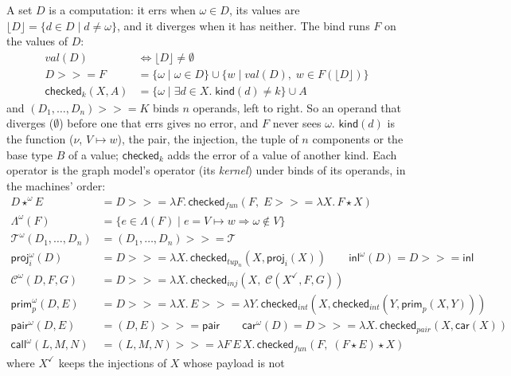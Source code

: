 \documentclass[10pt]{article}
\theoremstyle{acmplain}
\newcommand{\key}[1]{\mathsf{#1}}
\newcommand{\app}{\star}
\newcommand{\NE}{\neq\emptyset}
\newcommand{\bind}{\mathbin{>\!\!>\!\!=}}
\begin{document}
A set $D$ is a computation: it errs when $\omega \in D$, its values are
$\lfloor D \rfloor = \{ d \in D \mid d \neq \omega \}$, and it diverges
when it has neither. The bind runs $F$ on the values of $D$:
\begin{align*}
  \mathit{val}(D) &\iff \lfloor D \rfloor \NE \\
  D \bind F &= \{ \omega \mid \omega \in D \} \cup \{ w \mid \mathit{val}(D),\; w \in F(\lfloor D \rfloor) \} \\
  \key{checked}_k(X, A) &= \{ \omega \mid \exists d \in X.\; \key{kind}(d) \neq k \} \cup A
\end{align*}
and $(D_1, \ldots, D_n) \bind K$ binds $n$ operands, left to right. So an
operand that diverges ($\emptyset$) before one that errs gives no error,
and $F$ never sees $\omega$. $\key{kind}(d)$ is the function ($\nu$,
$V \mapsto w$), the pair, the injection, the tuple of $n$ components or
the base type $B$ of a value; $\key{checked}_k$ adds the error of a value
of another kind. Each operator is the graph model's operator (its
\emph{kernel}) under binds of its operands, in the machines' order:
\begin{align*}
  D \app^{\omega} E &= D \bind \lambda F.\, \key{checked}_{\mathit{fun}}(F,\; E \bind \lambda X.\, F \app X) \\
  \Lambda^{\omega}(F) &= \{ e \in \Lambda(F) \mid e = V \mapsto w \Rightarrow \omega \notin V \} \\
  \mathcal{T}^{\omega}(D_1,\ldots,D_n) &= (D_1, \ldots, D_n) \bind \mathcal{T} \\
  \key{proj}^{\omega}_i(D) &= D \bind \lambda X.\, \key{checked}_{\mathit{tup}_n}(X, \key{proj}_i(X)) \qquad
  \key{inl}^{\omega}(D) = D \bind \key{inl} \\
  \mathcal{C}^{\omega}(D, F, G) &= D \bind \lambda X.\, \key{checked}_{\mathit{inj}}(X,\; \mathcal{C}(X^{\checkmark}, F, G)) \\
  \key{prim}^{\omega}_p(D, E) &= D \bind \lambda X.\, E \bind \lambda Y.\,
    \key{checked}_{\mathit{int}}(X, \key{checked}_{\mathit{int}}(Y, \key{prim}_p(X, Y))) \\
  \key{pair}^{\omega}(D, E) &= (D, E) \bind \key{pair} \qquad
  \key{car}^{\omega}(D) = D \bind \lambda X.\, \key{checked}_{\mathit{pair}}(X, \key{car}(X)) \\
  \key{call}^{\omega}(L, M, N) &= (L, M, N) \bind \lambda F\, E\, X.\, \key{checked}_{\mathit{fun}}(F,\; (F \app E) \app X)
\end{align*}
where $X^{\checkmark}$ keeps the injections of $X$ whose payload is not
\end{document}

